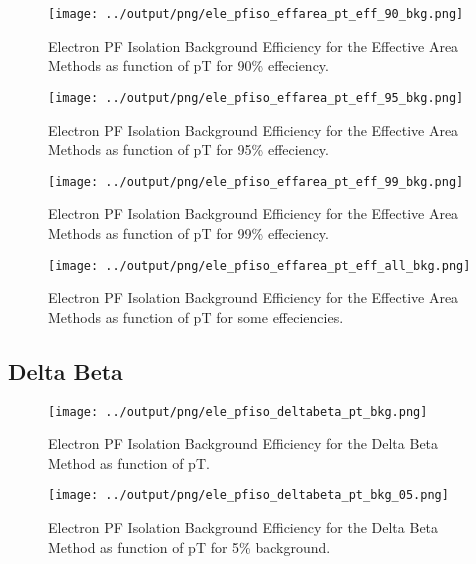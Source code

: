 \documentclass[11pt]{book}
\begin{document}
\begin{figure}[htb]
\centering
\texttt{[image: ../output/png/ele\_pfiso\_effarea\_pt\_eff\_90\_bkg.png]}
\caption{Electron PF Isolation Background Efficiency for the Effective Area Methods as function of pT for 90\% effeciency.}
\label{fig:ele_pfiso_pt_eff_effarea_eff_90_bkg}
\end{figure}

\begin{figure}[htb]
\centering
\texttt{[image: ../output/png/ele\_pfiso\_effarea\_pt\_eff\_95\_bkg.png]}
\caption{Electron PF Isolation Background Efficiency for the Effective Area Methods as function of pT for 95\% effeciency.}
\label{fig:ele_pfiso_pt_eff_effarea_eff_95_bkg}
\end{figure}

\begin{figure}[htb]
\centering
\texttt{[image: ../output/png/ele\_pfiso\_effarea\_pt\_eff\_99\_bkg.png]}
\caption{Electron PF Isolation Background Efficiency for the Effective Area Methods as function of pT for 99\% effeciency.}
\label{fig:ele_pfiso_pt_eff_effarea_eff_99_bkg}
\end{figure}

\begin{figure}[htb]
\centering
\texttt{[image: ../output/png/ele\_pfiso\_effarea\_pt\_eff\_all\_bkg.png]}
\caption{Electron PF Isolation Background Efficiency for the Effective Area Methods as function of pT for some effeciencies.}
\label{fig:ele_pfiso_pt_eff_effarea_eff_all_bkg}
\end{figure}
\clearpage

\subsection{Delta Beta}
\begin{figure}[htb]
\centering
\texttt{[image: ../output/png/ele\_pfiso\_deltabeta\_pt\_bkg.png]}
\caption{Electron PF Isolation Background Efficiency for the Delta Beta Method as function of pT.}
\label{fig:ele_pfiso_pt_bkg_deltabeta}
\end{figure}

\begin{figure}[htb]
\centering
\texttt{[image: ../output/png/ele\_pfiso\_deltabeta\_pt\_bkg\_05.png]}
\caption{Electron PF Isolation Background Efficiency for the Delta Beta Method as function of pT for 5\% background.}
\label{fig:ele_pfiso_pt_bkg_deltabeta_bkg_05}
\end{figure}
\end{document}
